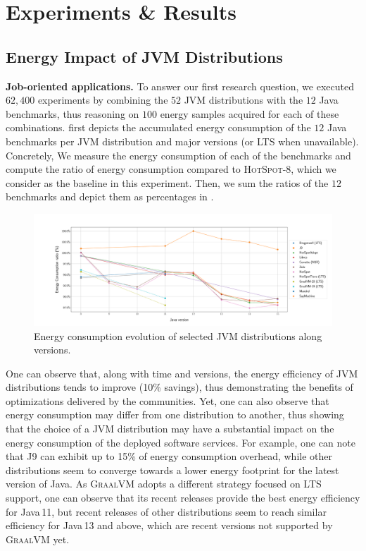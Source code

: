 \section{Experiments \& Results}\label{sec:exp}
\subsection{Energy Impact of JVM Distributions}
\noindent\textbf{Job-oriented applications.}
To answer our first research question, we executed $62,400$ experiments by combining the $52$ JVM distributions with the $12$ Java benchmarks, thus reasoning on $100$ energy samples acquired for each of these combinations.
 first depicts the accumulated energy consumption of the $12$ Java benchmarks per JVM distribution and major versions (or LTS when unavailable).
Concretely, We measure the energy consumption of each of the benchmarks and compute the ratio of energy consumption compared to \textsc{HotSpot-8}, which we consider as the baseline in this experiment.
Then, we sum the ratios of the $12$ benchmarks and depict them as percentages in .

\begin{figure}%
    \centering
    \includegraphics[width=\linewidth]{imgs/alljvms_chetemi8_baseon8.pdf}
    \caption{Energy consumption evolution of selected JVM distributions along versions.}
    \label{fig:JVMs}
\end{figure}

One can observe that, along with time and versions, the energy efficiency of JVM distributions tends to improve (10\% savings), thus demonstrating the benefits of optimizations delivered by the communities.
Yet, one can also observe that energy consumption may differ from one distribution to another, thus showing that the choice of a JVM distribution may have a substantial impact on the energy consumption of the deployed software services.
For example, one can note that \textsc{J9} can exhibit up to 15\% of energy consumption overhead, while other distributions seem to converge towards a lower energy footprint for the latest version of Java.
As \textsc{GraalVM} adopts a different strategy focused on LTS support, one can observe that its recent releases provide the best energy efficiency for Java\,11, but recent releases of other distributions seem to reach similar efficiency for Java\,13 and above, which are recent versions not supported by \textsc{GraalVM} yet.

